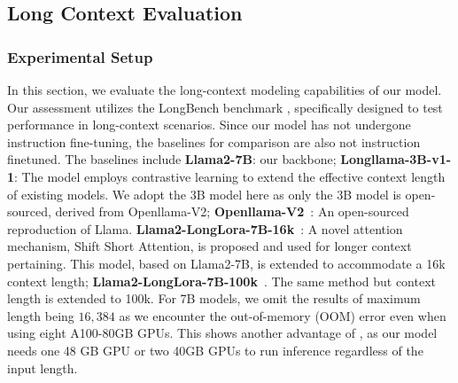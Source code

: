 \vspace{-5pt}
\subsection{Long Context Evaluation}
\label{sub:long_context_evaluation}
\vspace{-2pt}
\subsubsection{Experimental Setup}
In this section, we evaluate the long-context modeling capabilities of our model. Our assessment utilizes the LongBench benchmark \citep{longbench}, specifically designed to test performance in long-context scenarios. 
Since our model has not undergone instruction fine-tuning, the baselines for comparison are also not instruction finetuned. The baselines include \textbf{Llama2-7B}: our backbone; \textbf{Longllama-3B-v1-1}\citep{fot}: The model employs contrastive learning to extend the effective context length of existing models. We adopt the 3B model here as only the 3B model is open-sourced, derived from Openllama-V2; \textbf{Openllama-V2}~\citep{openlm2023openllama}: An open-sourced reproduction of Llama. \textbf{Llama2-LongLora-7B-16k}~\citep{longlora}: A novel attention mechanism, Shift Short Attention, is proposed and used for longer context pertaining. This model, based on Llama2-7B, is extended to accommodate a 16k context length; 
\textbf{Llama2-LongLora-7B-100k}~\citep{longlora}. The same method but context length is extended to 100k. 
For 7B models, we omit the results of maximum length being $16,384$ as we encounter the out-of-memory (OOM) error even when using eight A100-80GB GPUs. This shows another advantage of \ours, as our model needs one 48 GB GPU or two 40GB GPUs to run inference regardless of the input length.

\vspace{-5pt}
